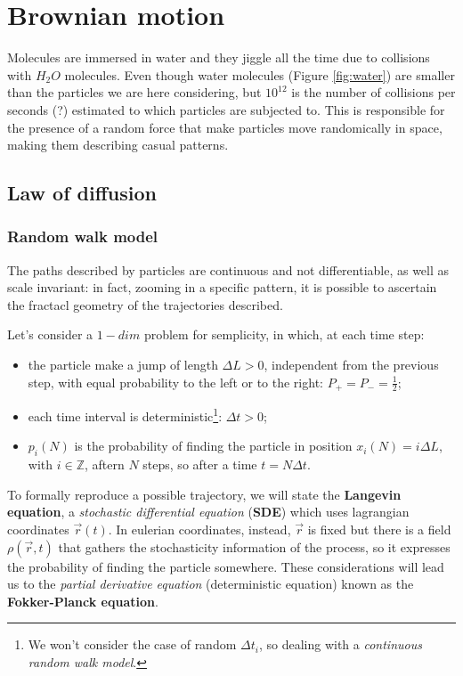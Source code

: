 \documentclass[../main/main.tex]{subfiles}
\begin{document}
\chapter{Brownian motion}
Molecules are immersed in water and they jiggle all the time due to collisions with $H_2 O$ molecules. Even though water molecules (Figure \ref{fig:water}) are smaller than the particles we are here considering, but $10^{12}$ is the number of collisions per seconds (?) estimated to which particles are subjected to. This is responsible for the presence of a random force that make particles move randomically in space, making them describing casual patterns. 
\section{Law of diffusion}
\subsection{Random walk model}
The paths described by particles are continuous and not differentiable, as well as scale invariant: in fact, zooming in a specific pattern, it is possible to ascertain the fractacl geometry of the trajectories described.  

Let's consider a $1-dim$ problem for semplicity, in which, at each time step:
\begin{itemize}
    \item the particle make a jump of length $\Delta L>0$, independent from the previous step, with equal probability to the left or to the right: $P_+=P_-=\frac{1}{2}$;
    \item each time interval is deterministic\footnote{We won't consider the case of random $\Delta t_i$, so dealing with a \emph{continuous random walk model}.}: $\Delta t>0$;
    \item $p_i(N)$ is the probability of finding the particle in position $x_i(N)=i\Delta L$, with $i\in\mathbb{Z}$, aftern $N$ steps, so after a time $t=N\Delta t$. 
\end{itemize}

To formally reproduce a possible trajectory, we will state the \textbf{Langevin equation}, a \emph{stochastic differential equation} (\textbf{SDE}) which uses lagrangian coordinates $\vec{r}(t)$. In eulerian coordinates, instead, $\vec{r}$ is fixed but there is a field $\rho(\vec{r},t)$ that gathers the stochasticity information of the process, so it expresses the probability of finding the particle somewhere. These considerations will lead us to the \emph{partial derivative equation} (deterministic equation) known as the \textbf{Fokker-Planck equation}.
\end{document}
